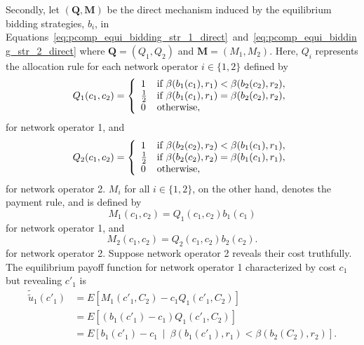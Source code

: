 Secondly, let $(\mathbf{Q},\mathbf{M})$ be the direct mechanism induced by the equilibrium bidding strategies, $b_i$, in Equations~\eqref{eq:pcomp_equi_bidding_str_1_direct}~and~\eqref{eq:pcomp_equi_bidding_str_2_direct} where $\mathbf{Q}=(Q_1,Q_2)$ and $\mathbf{M}=(M_1,M_2)$. Here, $Q_i$ represents the allocation rule for each network operator $i\in\{1, 2\}$ defined by
\begin{equation}
	\label{eq:pcomp_allocation_rule_1_direct}
	Q_1(c_1,c_2) =
	\left\{
	\begin{array}{l l}
		1 &\text{if } \beta(b_1(c_1),r_1) < \beta(b_2(c_2),r_2),\\
		\frac{1}{2} &\text{if } \beta(b_1(c_1),r_1) = \beta(b_2(c_2),r_2),\\
		0 &\text{otherwise},
	\end{array}
	\right.
\end{equation}
for network operator 1, and
\begin{equation}
	\label{eq:pcomp_allocation_rule_2_direct}
	Q_2(c_1,c_2) =
	\left\{
	\begin{array}{l l}
		1 &\text{if } \beta(b_2(c_2),r_2) < \beta(b_1(c_1),r_1),\\
		\frac{1}{2} &\text{if } \beta(b_2(c_2),r_2) = \beta(b_1(c_1),r_1),\\
		0 &\text{otherwise},
	\end{array}
	\right.
\end{equation}
for network operator 2. $M_i$ for all $i\in\{1,2\}$, on the other hand, denotes the payment rule, and is defined by
\begin{equation}
	\label{eq:pcomp_payment_rule_1_direct}
	M_1(c_1,c_2) = Q_1(c_1,c_2)b_1(c_1)
\end{equation}
for network operator 1, and
\begin{equation}
	\label{eq:pcomp_payment_rule_2_direct}
	M_2(c_1,c_2) = Q_2(c_1,c_2)b_2(c_2).
\end{equation}
for network operator 2. Suppose network operator 2 reveals their cost truthfully. The equilibrium payoff function for network operator 1 characterized by cost $c_1$ but revealing $c'_1$ is
\begin{align}
	\tilde{\tilde{u}}_1(c'_1) &= E\left[ M_1(c'_1,C_2) - c_1Q_1(c'_1,C_2) \right]\nonumber \\
	&= E\left[ (b_1(c'_1)-c_1)Q_1(c'_1,C_2) \right]\nonumber \\
	&= E\left[ b_1(c'_1)-c_1 \:\middle\vert\: \beta(b_1(c'_1),r_1) < \beta(b_2(C_2),r_2) \right].
	\label{eq:pcomp_expected_utility_direct}
\end{align}
